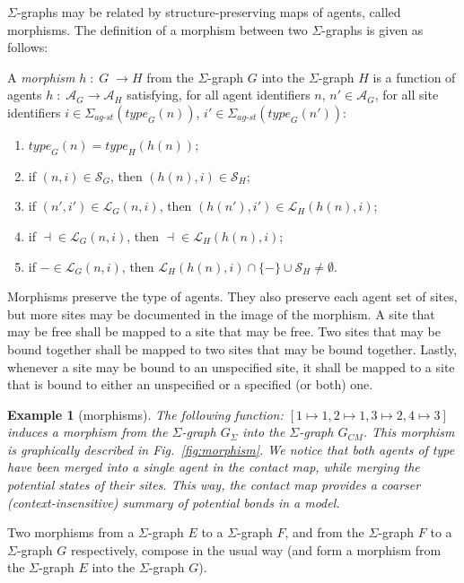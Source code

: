 \documentclass{entcs}
\newcommand{\freesymbol}{\dashv}
\newcommand{\boundsymbol}{-}
\renewcommand{\bound}[1]{\boundsymbol}
\newcommand{\graphsymb}{G}
\newcommand{\linksite}{\signaturesymb_{\textit{ag-st}}}
\newcommand{\signaturesymb}{\Sigma}
\newcommand{\agents}[1][\graphsymb]{\mathcal{A}_{#1}}
\newcommand{\type}[1][\graphsymb]{\textit{type}_{#1}}
\newcommand{\sites}[1][\graphsymb]{\mathcal{S}_{#1}}
\newcommand{\links}[1][\graphsymb]{\mathcal{L}_{#1}}
\newtheorem{myexample}[thm]{Example}
\begin{document}
$\Sigma$-graphs may be related by structure-preserving maps of agents, called morphisms. The definition of a morphism between two $\Sigma$-graphs  is given as follows:
\begin{defn}[morphisms]
 A \emph{morphism} $h\;:\;G\;\rightarrow H$ from the $\Sigma$-graph $G$ into the $\Sigma$-graph $H$ is a function of agents $h\;:\;\agents[G]\rightarrow \agents[H]$ satisfying,
for all agent identifiers $n$, $n'\in\agents[G]$, for all site identifiers $i\in\linksite(\type[G](n))$, $i'\in\linksite(\type[G](n'))$:
\begin{enumerate}
\item $\type[G](n) = \type[H](h(n))$;
\item if $(n,i)\in\sites[G]$, then $(h(n), i)\in\sites[H]$;
\item if $(n',i')\in\links[G](n,i)$, then $(h(n'),i')\in\links[H](h(n),i)$;
\item if \;$\freesymbol{ }\in\links[G](n,i)$, then \;$\freesymbol{ }\in\links[H](h(n),i)$;
\item if $\bound{}\in\links[G](n,i)$, then  $\links[H](h(n),i)\cap\{\bound{}\}\cup\sites[H]\neq\emptyset$.
\end{enumerate}
\end{defn}

Morphisms preserve the type of agents.
They also preserve each agent set of sites, but more sites may be documented in the image of the morphism. A site that may be free shall be mapped to a site that may be free. Two sites that may be bound together shall be mapped to two sites that may be bound together. Lastly, whenever a site may be bound to an unspecified site, it shall be mapped to a site that is bound to either an unspecified or a specified (or both) one.

\begin{myexample}[morphisms]
The following function: $[1 \mapsto 1, 2 \mapsto 1, 3\mapsto 2, 4\mapsto 3]$ induces a morphism from the $\Sigma$-graph $\graphsymb_{\Sigma}$ into the $\Sigma$-graph $\graphsymb_{\textit{CM}}$. This morphism is graphically described in Fig.~\ref{fig:morphism}. We notice that both agents of type  have been merged into a single agent in the contact map, while merging the potential states of their sites. This way, the contact map
provides a coarser
(context-insensitive) summary of potential bonds in a model.
\end{myexample}

Two morphisms from a $\Sigma$-graph  $E$ to a $\Sigma$-graph $F$, and from the $\Sigma$-graph $F$ to a $\Sigma$-graph $G$ respectively, compose in the usual way (and form a morphism from the $\Sigma$-graph $E$ into the
$\Sigma$-graph  $G$).
\end{document}
